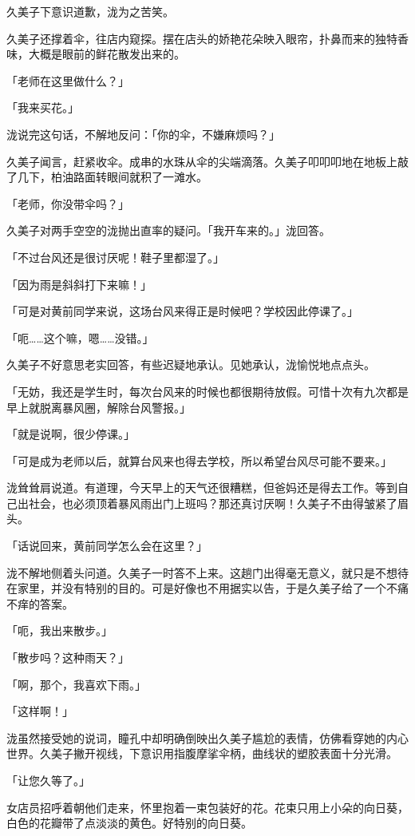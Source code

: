 \documentclass[UTF8]{ctexart}
\begin{document}
    久美子下意识道歉，泷为之苦笑。 

    久美子还撑着伞，往店内窥探。摆在店头的娇艳花朵映入眼帘，扑鼻而来的独特香味，大概是眼前的鲜花散发出来的。 

    「老师在这里做什么？」 

    「我来买花。」 

    泷说完这句话，不解地反问：「你的伞，不嫌麻烦吗？」 

    久美子闻言，赶紧收伞。成串的水珠从伞的尖端滴落。久美子叩叩叩地在地板上敲了几下，柏油路面转眼间就积了一滩水。 

    「老师，你没带伞吗？」 

    久美子对两手空空的泷抛出直率的疑问。「我开车来的。」泷回答。 

    「不过台风还是很讨厌呢！鞋子里都湿了。」 

    「因为雨是斜斜打下来嘛！」 

    「可是对黄前同学来说，这场台风来得正是时候吧？学校因此停课了。」 

    「呃……这个嘛，嗯……没错。」 

    久美子不好意思老实回答，有些迟疑地承认。见她承认，泷愉悦地点点头。 

    「无妨，我还是学生时，每次台风来的时候也都很期待放假。可惜十次有九次都是早上就脱离暴风圈，解除台风警报。」 

    「就是说啊，很少停课。」 

    「可是成为老师以后，就算台风来也得去学校，所以希望台风尽可能不要来。」 

    泷耸耸肩说道。有道理，今天早上的天气还很糟糕，但爸妈还是得去工作。等到自己出社会，也必须顶着暴风雨出门上班吗？那还真讨厌啊！久美子不由得皱紧了眉头。 

    「话说回来，黄前同学怎么会在这里？」 

    泷不解地侧着头问道。久美子一时答不上来。这趟门出得毫无意义，就只是不想待在家里，并没有特别的目的。可是好像也不用据实以告，于是久美子给了一个不痛不痒的答案。 

    「呃，我出来散步。」 

    「散步吗？这种雨天？」 

    「啊，那个，我喜欢下雨。」 

    「这样啊！」 

    泷虽然接受她的说词，瞳孔中却明确倒映出久美子尴尬的表情，仿佛看穿她的内心世界。久美子撇开视线，下意识用指腹摩挲伞柄，曲线状的塑胶表面十分光滑。 

    「让您久等了。」 

    女店员招呼着朝他们走来，怀里抱着一束包装好的花。花束只用上小朵的向日葵，白色的花瓣带了点淡淡的黄色。好特别的向日葵。 
\end{document}
